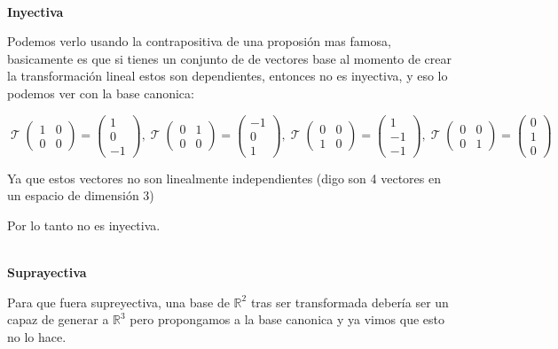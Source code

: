 \documentclass[12pt]{report}                                %
\DeclareMathOperator \LinealTransformation {\mathcal{T}}
\begin{document}
            \textbf{\\Inyectiva}

            Podemos verlo usando la contrapositiva de una proposión mas famosa, basicamente es que si
            tienes un conjunto de de vectores base al momento de crear la transformación lineal estos son dependientes, 
            entonces no es inyectiva, y eso lo podemos ver con la base canonica:

            \begin{equation*}
                \LinealTransformation(\begin{matrix}1&0\\0&0\end{matrix}) = \begin{pmatrix}1\\0\\-1\end{pmatrix}, 
                \LinealTransformation(\begin{matrix}0&1\\0&0\end{matrix}) = \begin{pmatrix}-1\\0\\1\end{pmatrix}, 
                \LinealTransformation(\begin{matrix}0&0\\1&0\end{matrix}) = \begin{pmatrix}1\\-1\\-1\end{pmatrix}, 
                \LinealTransformation(\begin{matrix}0&0\\0&1\end{matrix}) = \begin{pmatrix}0\\1\\0\end{pmatrix} 
            \end{equation*}

            Ya que estos vectores no son linealmente independientes (digo son 4 vectores en un espacio de dimensión 3)

            Por lo tanto no es inyectiva.

            \textbf{\\Suprayectiva}

            Para que fuera supreyectiva, una base de $\mathbb{R}^2$ tras ser transformada debería ser un capaz de
            generar a $\mathbb{R}^3$ pero propongamos a la base canonica y ya vimos que esto no lo hace.
\end{document}
